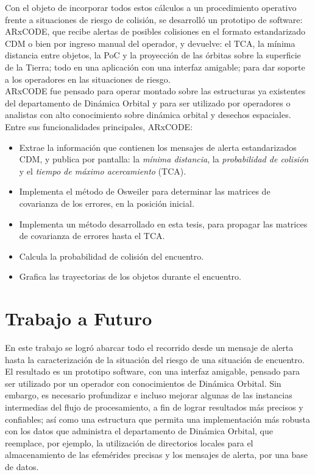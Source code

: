 Con el objeto de incorporar todos estos c\'alculos a un procedimiento operativo frente a situaciones de riesgo de colisi\'on, se desarroll\'o un prototipo de software: ARxCODE, que recibe alertas de posibles colisiones en el formato estandarizado CDM o bien por ingreso manual del operador, y devuelve: el TCA, la m\'inima distancia entre objetos, la PoC y la proyecci\'on de las \'orbitas sobre la superficie de la Tierra; todo en una aplicaci\'on con una interfaz amigable; para dar soporte a los operadores en las situaciones de riesgo.\\

ARxCODE fue pensado para operar montado sobre las estructuras ya existentes del departamento de Din\'amica Orbital y para ser utilizado por operadores o analistas con alto conocimiento sobre din\'amica orbital y desechos espaciales.\\

Entre sus funcionalidades principales, ARxCODE:

\begin{itemize}
 \item Extrae la informaci\'on que contienen los mensajes de alerta estandarizados CDM, y publica por pantalla: la {\it{m\'inima distancia}}, la {\it{probabilidad de colisi\'on}} y el {\it{tiempo de m\'aximo acercamiento}} (TCA). 
 \item Implementa el m\'etodo de Osweiler \citep{osweiler} para determinar las matrices de covarianza de los errores, en la posici\'on inicial.
 \item Implementa un m\'etodo desarrollado en esta tesis, para propagar las matrices de covarianza de errores hasta el TCA.
 \item Calcula la probabilidad de colisi\'on del encuentro.
 \item Grafica las trayectorias de los objetos durante el encuentro.
\end{itemize}


\section*{Trabajo a Futuro}

En este trabajo se logr\'o abarcar todo el recorrido desde un mensaje de alerta hasta la caracterizaci\'on de la situaci\'on del riesgo de una situaci\'on de encuentro. El resultado es un prototipo software, con una interfaz amigable, pensado para ser utilizado por un operador con conocimientos de Din\'amica Orbital. Sin embargo, es necesario profundizar e incluso mejorar algunas de las instancias intermedias del flujo de procesamiento, a fin de lograr resultados m\'as precisos y confiables; as\'i como una estructura que permita una implementaci\'on m\'as robusta con los datos que administra el departamento de Din\'amica Orbital, que reemplace, por ejemplo, la utilizaci\'on de directorios locales para el almacenamiento de las efem\'erides precisas y los mensajes de alerta, por una base de datos.\\

